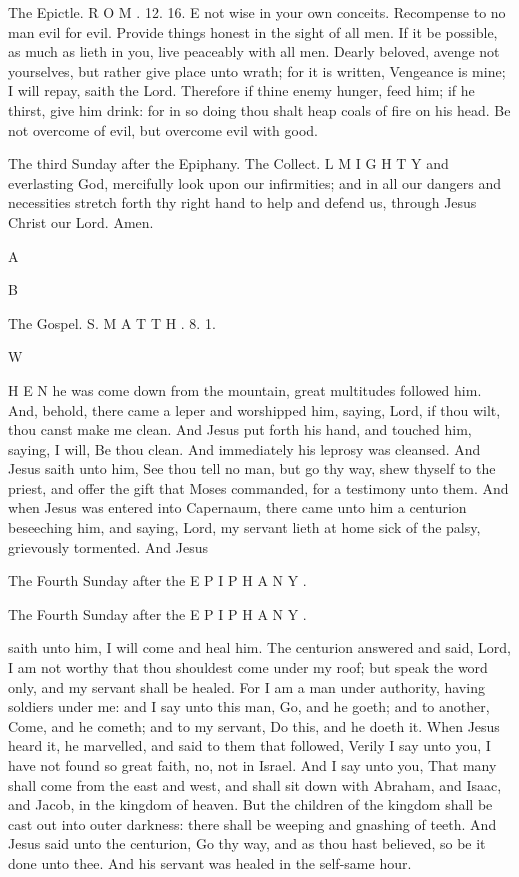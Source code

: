 The Epictle. R O M . 12. 16. E not wise in your own conceits. Recompense to no man evil for evil. Provide things honest in the sight of all men. If it be possible, as much as lieth in you, live peaceably with all men. Dearly beloved, avenge not yourselves, but rather give place unto wrath; for it is written, Vengeance is mine; I will repay, saith the Lord. Therefore if thine enemy hunger, feed him; if he thirst, give him drink: for in so doing thou shalt heap coals of fire on his head. Be not overcome of evil, but overcome evil with good.

The third Sunday after the Epiphany. The Collect. L M I G H T Y and everlasting God, mercifully look upon our infirmities; and in all our dangers and necessities stretch forth thy right hand to help and defend us, through Jesus Christ our Lord. Amen.

A

B

The Gospel. S. M A T T H . 8. 1.

W

H E N he was come down from the mountain, great multitudes followed him. And, behold, there came a leper and worshipped him, saying, Lord, if thou wilt, thou canst make me clean. And Jesus put forth his hand, and touched him, saying, I will, Be thou clean. And immediately his leprosy was cleansed. And Jesus saith unto him, See thou tell no man, but go thy way, shew thyself to the priest, and offer the gift that Moses commanded, for a testimony unto them. And when Jesus was entered into Capernaum, there came unto him a centurion beseeching him, and saying, Lord, my servant lieth at home sick of the palsy, grievously tormented. And Jesus

The Fourth Sunday after the E P I P H A N Y .

The Fourth Sunday after the E P I P H A N Y .

saith unto him, I will come and heal him. The centurion answered and said, Lord, I am not worthy that thou shouldest come under my roof; but speak the word only, and my servant shall be healed. For I am a man under authority, having soldiers under me: and I say unto this man, Go, and he goeth; and to another, Come, and he cometh; and to my servant, Do this, and he doeth it. When Jesus heard it, he marvelled, and said to them that followed, Verily I say unto you, I have not found so great faith, no, not in Israel. And I say unto you, That many shall come from the east and west, and shall sit down with Abraham, and Isaac, and Jacob, in the kingdom of heaven. But the children of the kingdom shall be cast out into outer darkness: there shall be weeping and gnashing of teeth. And Jesus said unto the centurion, Go thy way, and as thou hast believed, so be it done unto thee. And his servant was healed in the self-same hour.


